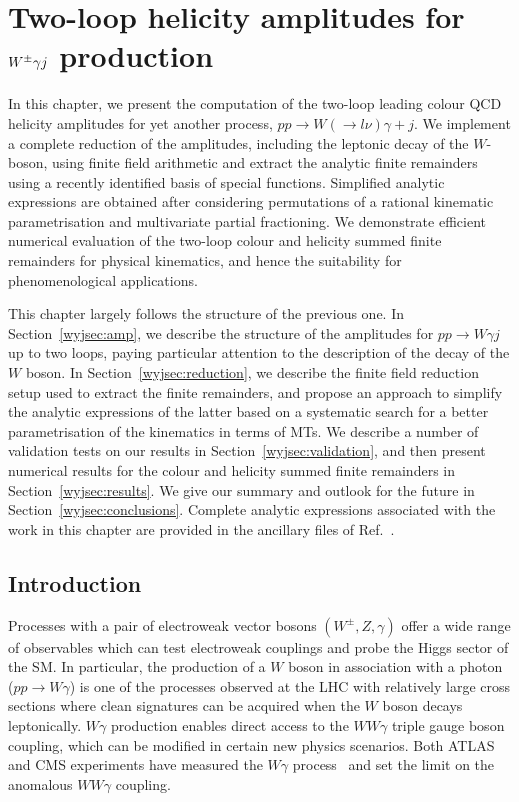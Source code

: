 \documentclass[main.tex]{subfiles}
\begin{document}
\chapter{Two-loop helicity amplitudes for $W^\pm \gamma j$ production} \label{sec:Wyj}
In this chapter, we present the computation of the two-loop leading colour QCD helicity amplitudes for yet another process, $pp\to W(\to l\nu)\gamma+j$. We implement a complete reduction of the amplitudes, including the leptonic decay of the $W$-boson,
using finite field arithmetic and extract the analytic finite remainders using a recently
identified basis of special functions. Simplified analytic expressions are obtained after considering
permutations of a rational kinematic parametrisation and multivariate partial fractioning. We
demonstrate efficient numerical evaluation of the two-loop colour and helicity summed finite
remainders for physical kinematics, and hence the suitability for phenomenological applications.

This chapter largely follows the structure of the previous one. In Section~\ref{wyjsec:amp}, we describe the structure of the
amplitudes for $pp\to W\gamma j$ up to two loops, paying particular attention to the description of
the decay of the $W$ boson. In Section~\ref{wyjsec:reduction}, we describe the finite field reduction
setup used to extract the finite remainders, and propose an approach to simplify the analytic expressions of the latter based on a systematic search for a better parametrisation of the kinematics in terms of MTs. We describe a number of validation tests on our results in Section~\ref{wyjsec:validation}, and then present numerical results for the
colour and helicity summed finite remainders in Section~\ref{wyjsec:results}. We
give our summary and outlook for the future in Section~\ref{wyjsec:conclusions}. Complete analytic expressions associated with the work in this chapter are provided in the ancillary files of Ref.~\cite{Badger:2022ncb}.

\section{Introduction \label{wyjsec:intro}}
Processes with a pair of electroweak vector bosons $(W^\pm,Z,\gamma)$ offer a wide
range of observables which can test electroweak couplings and probe the Higgs sector of the SM. In particular, the production of a $W$ boson in association with a photon ($pp\to W\gamma$) is
one of the processes observed at the LHC with relatively large cross sections where clean
signatures can be acquired when the $W$ boson decays leptonically. $W\gamma$ production enables direct access to
the $WW\gamma$ triple gauge boson coupling, which can be modified in certain new physics scenarios.
Both ATLAS and CMS experiments have measured the $W\gamma$ process~\cite{CMS:2011myh,ATLAS:2011nmx,ATLAS:2012bpb,ATLAS:2013way,CMS:2013ryd,CMS:2021foa} and set the limit on the
anomalous $WW\gamma$ coupling.
\end{document}
